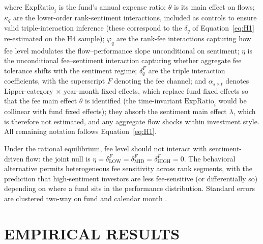 \documentclass[12pt, oneside]{report}
\let\phi\varphi
\begin{document}
\noindent where $\text{ExpRatio}_i$ is the fund's annual expense ratio;
$\theta$ is its main effect on flows; $\kappa_q$ are the lower-order
rank-sentiment interactions, included as controls to ensure valid
triple-interaction inference (these correspond to the $\delta_q$ of
Equation~\ref{eq:H1} re-estimated on the H4 sample); $\phi_q$ are
the rank-fee interactions capturing how fee level modulates the
flow--performance slope unconditional on sentiment; $\eta$ is the
unconditional fee--sentiment interaction capturing whether aggregate
fee tolerance shifts with the sentiment regime; $\delta^F_q$ are the
triple interaction coefficients, with the superscript $F$ denoting
the fee channel; and $\alpha_{s \times t}$ denotes
Lipper-category $\times$ year-month fixed effects, which replace
fund fixed effects so that the fee main effect $\theta$ is identified
(the time-invariant $\text{ExpRatio}_i$ would be collinear with fund
fixed effects); they absorb the sentiment main effect $\lambda$, which
is therefore not estimated, and any aggregate flow shocks within
investment style. All remaining notation follows
Equation~\ref{eq:H1}. 

Under the \textcite{BerkGreen2004} rational
equilibrium, fee level should not interact with sentiment-driven
flow: the joint null is $\eta = \delta^F_{\text{LOW}} =
\delta^F_{\text{MID}} = \delta^F_{\text{HIGH}} = 0$. The behavioral
alternative permits heterogeneous fee sensitivity across rank
segments, with the prediction that high-sentiment investors are less
fee-sensitive (or differentially so) depending on where a fund sits
in the performance distribution. Standard errors are clustered
two-way on fund and calendar month \parencite{Petersen2009}.

\chapter{EMPIRICAL RESULTS}
\label{ch:results}
\end{document}
